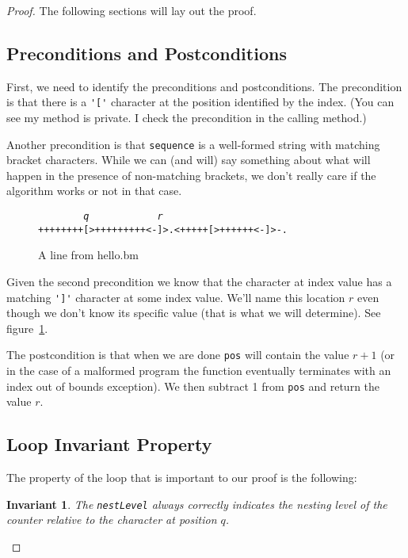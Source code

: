 \documentclass[10pt]{amsart}
\newcommand{\inl}{\lstinline[breaklines=true]}
\newtheorem*{invariant}{Invariant}
\begin{document}
\begin{proof}
The following sections will lay out the proof.

\subsection*{Preconditions and Postconditions}
First, we need to identify the preconditions and postconditions. The
precondition is that there is a \inl!'['! character at the position identified
by the index. (You can see my method is private. I check the precondition
in the calling method.)

Another precondition is that \inl!sequence! is a well-formed string with
matching bracket characters. While we can (and will) say something
about what will happen in the presence of non-matching brackets, we
don't really care if the algorithm works or not in that case.

\begin{figure}
\caption{A line from hello.bm}
\label{fig:hello}
\begin{flushleft}
\texttt{
\ \ \ \ \ \ \ \emph{q}\ \ \ \ \ \ \ \ \ \ \ \ \emph{r}  \\
++++++++[>+++++++++<-]>.<+++++[>++++++<-]>-.
}
\end{flushleft}
\end{figure}

Given the second precondition we know that the character at index value
has a matching \inl!']'! character at some index value. We'll name
this location $r$ even though we don't know its specific value (that
is what we will determine). See figure~\ref{fig:hello}.

The postcondition is that when we are done \inl!pos! will
contain the value $r+1$ (or in the case of a malformed program
the function eventually terminates with an index out of bounds exception).
We then subtract 1 from \inl!pos! and return the value $r$.

\subsection*{Loop Invariant Property}
The property of the loop that is important to our proof is the following: 

\begin{invariant}
The \inl!nestLevel! always correctly indicates the nesting level of the
counter relative to the character at position $q$. 
\end{invariant}


\end{proof}
\end{document}
